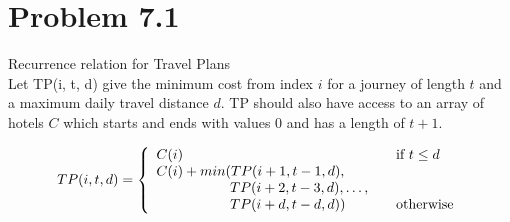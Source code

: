 \documentclass[12pt,letterpaper]{article}
\newcommand\hwnum{7}                  %
\newenvironment{answer}[2]{
  \section*{Problem \hwnum.#1}
}{\newpage}
\begin{document}
\begin{answer}{1}

\textbf{Recurrence relation for Travel Plans}\\
Let TP(i, t, d) give the minimum cost from index $i$ for a journey of length $t$ and a maximum daily travel distance $d$. TP should also have access to an array of hotels $C$ which starts and ends with values 0 and has a length of $t+1$.

\[ TP(i, t, d) = \left\{ 
  \begin{array}{l l}
    C(i) & \quad \text{if $t \le d$}\\
    C(i) + min(TP(i+1, t-1, d), \\
    \;\;\;\;\;\;\;\;\;\;\;\;\;\;\;\;\;\;\;TP(i+2, t-3, d), \dots,\\
    \;\;\;\;\;\;\;\;\;\;\;\;\;\;\;\;\;\;\;TP(i+d, t-d, d)) & \quad \text{otherwise}
  \end{array} \right.\]\\


\end{answer}
\end{document}
